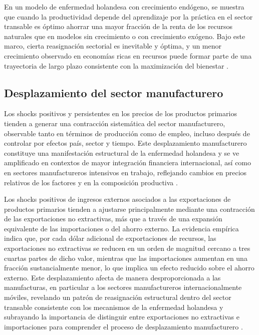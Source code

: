 \documentclass[../../TFM.tex]{subfiles}
\begin{document}
	En un modelo de enfermedad holandesa con crecimiento endógeno, se muestra que cuando la productividad depende del aprendizaje por la práctica en el sector transable es óptimo ahorrar una mayor fracción de la renta de los recursos naturales que en modelos sin crecimiento o con crecimiento exógeno. Bajo este marco, cierta reasignación sectorial es inevitable y óptima, y un menor crecimiento observado en economías ricas en recursos puede formar parte de una trayectoria de largo plazo consistente con la maximización del bienestar \parencite{Matsen2005}.
	
	\subsection{Desplazamiento del sector manufacturero}
	\label{subsec:desplazamiento-sector-manufacturero}
	
	Los shocks positivos y persistentes en los precios de los productos primarios tienden a generar una contracción sistemática del sector manufacturero, observable tanto en términos de producción como de empleo, incluso después de controlar por efectos país, sector y tiempo. Este desplazamiento manufacturero constituye una manifestación estructural de la enfermedad holandesa y se ve amplificado en contextos de mayor integración financiera internacional, así como en sectores manufactureros intensivos en trabajo, reflejando cambios en precios relativos de los factores y en la composición productiva \parencite{Ismail2010}.
	
	Los shocks positivos de ingresos externos asociados a las exportaciones de productos primarios tienden a ajustarse principalmente mediante una contracción de las exportaciones no extractivas, más que a través de una expansión equivalente de las importaciones o del ahorro externo. La evidencia empírica indica que, por cada dólar adicional de exportaciones de recursos, las exportaciones no extractivas se reducen en un orden de magnitud cercano a tres cuartas partes de dicho valor, mientras que las importaciones aumentan en una fracción sustancialmente menor, lo que implica un efecto reducido sobre el ahorro externo. Este desplazamiento afecta de manera desproporcionada a las manufacturas, en particular a los sectores manufactureros internacionalmente móviles, revelando un patrón de reasignación estructural dentro del sector transable consistente con los mecanismos de la enfermedad holandesa y subrayando la importancia de distinguir entre exportaciones no extractivas e importaciones para comprender el proceso de desplazamiento manufacturero \parencite{Harding2016}.	
	
\end{document}
